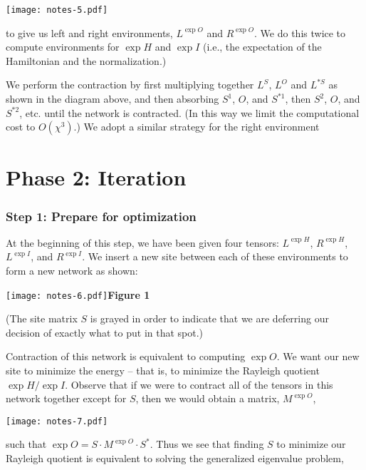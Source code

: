 \documentclass[12pt]{amsart}
\begin{document}
    \begin{center}\texttt{[image: notes-5.pdf]}\end{center}

\noindent to give us left and right environments, $L^{\exp{O}}$ and $R^{\exp{O}}$.  We do this twice to compute environments for $\exp{H}$ and $\exp{I}$ (i.e., the expectation of the Hamiltonian and the normalization.)

We perform the contraction by first multiplying together $L^S$, $L^O$ and $L^{*S}$ as shown in the diagram above, and then absorbing $S^1$, $O$, and $S^{*1}$, then $S^2$, $O$, and $S^{*2}$, etc. until the network is contracted.  (In this way we limit the computational cost to $O(\chi^3)$.)  We adopt a similar strategy for the right environment

\part*{Phase 2: Iteration}

\section*{Step 1:  Prepare for optimization}

At the beginning of this step, we have been given four tensors:  $L^{\exp{H}}$, $R^{\exp{H}}$, $L^{\exp{I}}$, and $R^{\exp{I}}$.  We insert a new site between each of these environments to form a new network as shown:

    \begin{center}\texttt{[image: notes-6.pdf]}\textbf{Figure 1}\end{center}

(The site matrix $S$ is grayed in order to indicate that we are deferring our decision of exactly what to put in that spot.)

Contraction of this network is equivalent to computing $\exp{O}$.  We want our new site to minimize the energy -- that is, to minimize the Rayleigh quotient $\exp{H}/\exp{I}$.  Observe that if we were to contract all of the tensors in this network together except for $S$, then we would obtain a matrix, $M^{\exp{O}}$,

    \begin{center}\texttt{[image: notes-7.pdf]}\end{center}

\noindent such that $\exp{O} = S \cdot M^{\exp{O}} \cdot S^*.$  Thus we see that finding $S$ to minimize our Rayleigh quotient is equivalent to solving the generalized eigenvalue problem,
\end{document}
